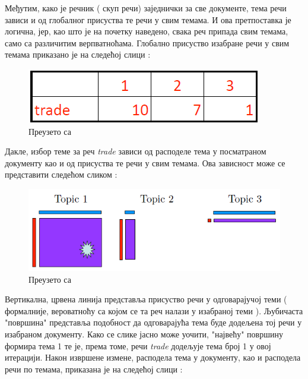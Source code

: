 Међутим, како је речник ( скуп речи) заједнички за све документе, тема речи зависи и од глобалног присуства те речи у свим темама. И ова претпоставка је логична, јер, као што је на почетку наведено, свака реч припада свим темама, само са различитим верпватноћама. Глобално присуство изабране речи у свим темама приказано је на следећој слици :

\begin{figure}[H]
    \centering
   \includegraphics[scale=0.6]{./Slike/slika9.png} 
	\caption{Преузето са \cite{mimno1}}
	\label{fig:slika9}
\end{figure}


Дакле, избор теме за реч \textit{trade}  зависи од расподеле тема у посматраном документу као и од присуства те речи у свим темама. Ова зависност може се представити следећом сликом :

\begin{figure}[H]
    \centering
   \includegraphics[scale=0.6]{./Slike/slika10.png} 
	\caption{Преузето са \cite{mimno1}}
	\label{fig:slika10}
\end{figure}

Вертикална, црвена линија представља присуство речи у одговарајучој теми ( формалније, вероватноћу са којом се та реч налази у изабраној теми ). Љубичаста "површина" представља подобност да одговарајућа тема буде додељена тој речи у изабраном документу. Како се слике јасно може уочити, "највећу"  површину формира тема 1 те је, према томе, речи  \textit{trade} додељује тема број 1 у овој итерацији. Након извршене измене, расподела тема у документу, као и расподела речи по темама, приказана је на следећој слици :



